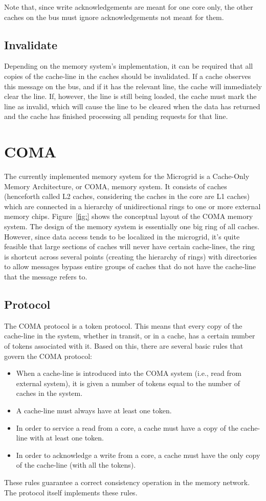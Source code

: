 Note that, since write acknowledgements are meant for one core only, the other caches on the bus must ignore acknowledgements not meant for them.

\subsection{Invalidate}
Depending on the memory system's implementation, it can be required that all copies of the cache-line in the caches should be invalidated. If a cache observes this message on the bus, and if it has the relevant line, the cache will immediately clear the line. If, however, the line is still being loaded, the cache must mark the line as invalid, which will cause the line to be cleared when the data has returned and the cache has finished processing all pending requests for that line.

\section{\label{sec:coma}COMA}
The currently implemented memory system for the Microgrid is a Cache-Only Memory Architecture, or COMA, memory system. It consists of caches (henceforth called L2 caches, considering the caches in the core are L1 caches) which are connected in a hierarchy of unidirectional rings to one or more external memory chips. Figure~\ref{fig:} shows the conceptual layout of the COMA memory system. The design of the memory system is essentially one big ring of all caches. However, since data access tends to be localized in the microgrid, it's quite feasible that large sections of caches will never have certain cache-lines, the ring is shortcut across several points (creating the hierarchy of rings) with directories to allow messages bypass entire groups of caches that do not have the cache-line that the message refers to.

\subsection{Protocol}
The COMA protocol is a token protocol. This means that every copy of the cache-line in the system, whether in transit, or in a cache, has a certain number of tokens associated with it. Based on this, there are several basic rules that govern the COMA protocol:
\begin{itemize}
\item When a cache-line is introduced into the COMA system (i.e., read from external system), it is given a number of tokens equal to the number of caches in the system.
\item A cache-line must always have at least one token.
\item In order to service a read from a core, a cache must have a copy of the cache-line with at least one token.
\item In order to acknowledge a write from a core, a cache must have the only copy of the cache-line (with all the tokens).
\end{itemize}
These rules guarantee a correct consistency operation in the memory network. The protocol itself implements these rules.

